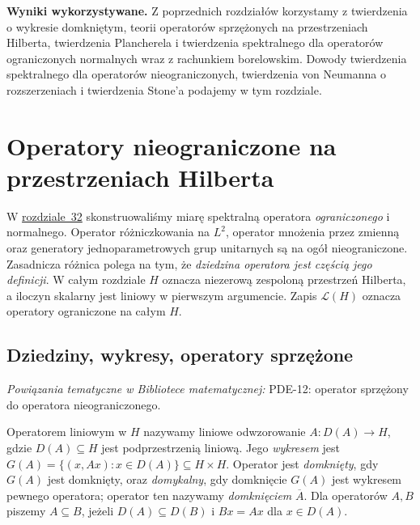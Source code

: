\begingroup
\setlength{\parskip}{3pt}
\setcounter{section}{32}
\noindent\textbf{Wyniki wykorzystywane.} Z poprzednich rozdziałów korzystamy z twierdzenia o wykresie domkniętym, teorii operatorów sprzężonych na przestrzeniach Hilberta, twierdzenia Plancherela i twierdzenia spektralnego dla operatorów ograniczonych normalnych wraz z rachunkiem borelowskim. Dowody twierdzenia spektralnego dla operatorów nieograniczonych, twierdzenia von Neumanna o rozszerzeniach i twierdzenia Stone'a podajemy w tym rozdziale.\par\medskip
\section{Operatory nieograniczone na przestrzeniach Hilberta}
\label{sec:unbounded33}

\providecommand{\atlasref}[2]{#2}


W \hyperref[sec:spectral-hilbert32]{rozdziale~32} skonstruowaliśmy miarę spektralną
operatora \emph{ograniczonego} i normalnego. Operator różniczkowania na
$L^2$, operator mnożenia przez zmienną oraz generatory jednoparametrowych
grup unitarnych są na ogół nieograniczone. Zasadnicza różnica polega na tym,
że \emph{dziedzina operatora jest częścią jego definicji}. W całym rozdziale
$H$ oznacza niezerową zespoloną przestrzeń Hilberta, a iloczyn skalarny jest liniowy
w pierwszym argumencie. Zapis $\mathcal L(H)$ oznacza operatory ograniczone
na całym $H$.

\subsection{Dziedziny, wykresy, operatory sprzężone}

\noindent\emph{Powiązania tematyczne w Bibliotece matematycznej:} \atlasref{PDE-12::def:pde12-adjoint}{PDE-12: operator sprzężony do operatora nieograniczonego}.


\begin{definicja}
\label{def:unbounded-operator33}
Operatorem liniowym w $H$ nazywamy liniowe odwzorowanie
$A:D(A)\to H$, gdzie $D(A)\subseteq H$ jest podprzestrzenią liniową.
Jego \emph{wykresem} jest $G(A)=\{(x,Ax):x\in D(A)\}\subseteq H\times H$.
Operator jest \emph{domknięty}, gdy $G(A)$ jest domknięty, oraz
\emph{domykalny}, gdy domknięcie $G(A)$ jest wykresem pewnego operatora;
operator ten nazywamy \emph{domknięciem} $\overline A$.
Dla operatorów $A,B$ piszemy $A\subseteq B$, jeżeli
$D(A)\subseteq D(B)$ i $Bx=Ax$ dla $x\in D(A)$.
\end{definicja}


